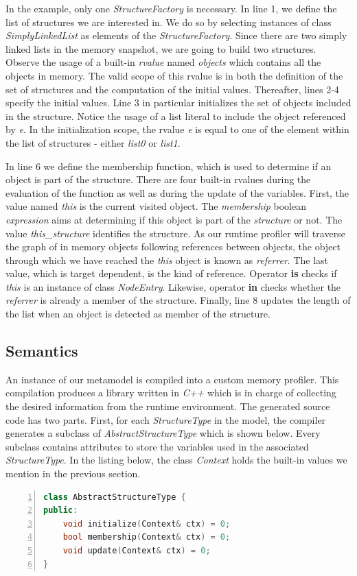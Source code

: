 In the example, only one \textit{StructureFactory} is necessary.
In line 1, we define the list of structures we are interested in.
We do so by selecting instances of class \textit{SimplyLinkedList} as elements of the \textit{StructureFactory}.
Since there are two simply linked lists in the memory snapshot, we are going to build two structures.
Observe the usage of a built-in \textit{rvalue} named \textit{objects} which contains all the objects in memory.
The valid scope of this rvalue is in both the definition of the set of structures and the computation of the initial values.
Thereafter, lines 2-4 specify the initial values.
Line 3 in particular initializes the set of objects included in the structure.
Notice the usage of a list literal to include the object referenced by \textit{e}.
In the initialization scope, the rvalue \textit{e} is equal to one of the element within the list of structures - either \textit{list0} or \textit{list1}.

In line 6 we define the membership function, which is used to determine if an object is part of the structure.
There are four built-in rvalues during the evaluation of the function as well as during the update of the variables.
First, the value named \textit{this} is the current visited object. 
The \textit{membership} boolean \textit{expression} aims at determining if this object is part of the \textit{structure} or not. 
The value \textit{this\_structure} identifies the structure.
As our runtime profiler will traverse the graph of in memory objects following references between objects, the object through which we have reached the \textit{this} object is known as \textit{referrer}.
The last value, which is target dependent, is the kind of reference.
Operator \textbf{is} checks if \textit{this} is an instance of class \textit{NodeEntry}.
Likewise, operator \textbf{in} checks whether the \textit{referrer} is already a member of the structure.
Finally, line 8 updates the length of the list when an object is detected as member of the structure.

\subsection{Semantics}\label{sec:semantic}

An instance of our metamodel is compiled into a custom memory profiler.
This compilation produces a library written in \textit{C++} which is in charge of collecting the desired information from the runtime environment.
The generated source code has two parts.
First, for each \textit{StructureType} in the model, the compiler generates a subclass of \textit{AbstractStructureType} which is shown below.
Every subclass contains attributes to store the variables used in the associated \textit{StructureType}.
In the listing below, the class \textit{Context} holds the built-in values we mention in the previous section.
\begin{lstlisting}[language=C++, frame=none,
numbers=left,
numberstyle=\color{black}\scriptsize,]
class AbstractStructureType {
public:
	void initialize(Context& ctx) = 0;
	bool membership(Context& ctx) = 0;
	void update(Context& ctx) = 0;
}
\end{lstlisting}

